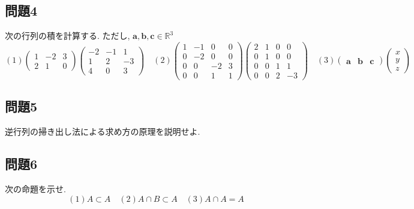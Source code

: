 \documentclass[a4j,dvipdfmx]{jsarticle}
\begin{document}
    \subsection*{問題4}
        次の行列の積を計算する. ただし, $\bm{a},\bm{b},\bm{c}\in \mathbb{R}^3$
        \begin{equation*}
            (1)\begin{pmatrix}
                1 & -2 & 3\\
                2 & 1 & 0
            \end{pmatrix}
            \begin{pmatrix}
                -2 & -1 & 1\\
                1 & 2 & -3\\
                4 & 0 & 3
            \end{pmatrix}\quad 
            (2)\begin{pmatrix}
                1 & -1 & 0 & 0\\
                0 & -2 & 0 & 0\\
                0 & 0  & -2 & 3\\
                0 & 0  & 1 & 1
            \end{pmatrix}
            \begin{pmatrix}
                2 & 1 & 0 & 0\\
                0 & 1 & 0 & 0\\
                0 & 0  & 1 & 1\\
                0 & 0  & 2 & -3
            \end{pmatrix}\quad
            (3)\begin{pmatrix}
                \bm{a} & \bm{b} & \bm{c}
            \end{pmatrix}
            \begin{pmatrix}
                x\\
                y\\
                z
            \end{pmatrix}
        \end{equation*}
    \subsection*{問題5}
        逆行列の掃き出し法による求め方の原理を説明せよ.
    \subsection*{問題6}
        次の命題を示せ.
        \begin{equation*}
            (1)A\subset A \quad (2)A\cap B\subset A\quad (3)A\cap A = A
        \end{equation*}
\end{document}
